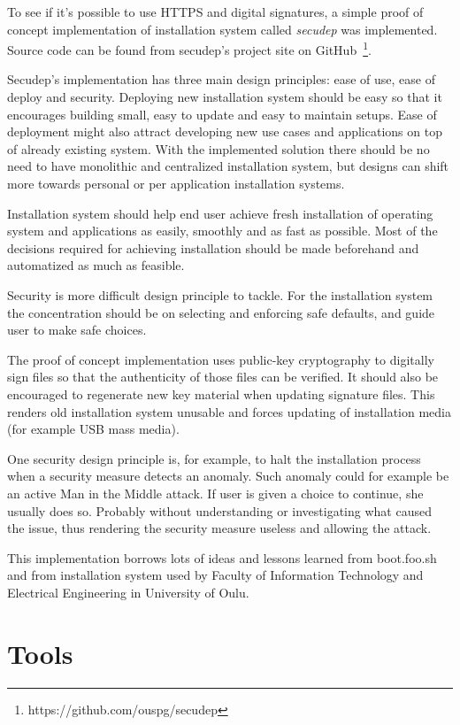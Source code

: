 
To see if it's possible to use HTTPS and digital signatures, a simple
proof of concept implementation of installation system
called \emph{secudep} was implemented. Source code can be found from
secudep's project site on
GitHub~\footnote{https://github.com/ouspg/secudep}.

Secudep's implementation has three main design principles: ease of
use, ease of deploy and security. Deploying new installation system
should be easy so that it encourages building small, easy to update
and easy to maintain setups. Ease of deployment might also attract
developing new use cases and applications on top of already existing
system. With the implemented solution there should be no need to have
monolithic and centralized installation system, but designs can shift
more towards personal or per application installation systems.

Installation system should help end user achieve fresh installation of
operating system and applications as easily, smoothly and as fast as
possible. Most of the decisions required for achieving installation
should be made beforehand and automatized as much as feasible.

Security is more difficult design principle to tackle. For the
installation system the concentration should be on selecting and
enforcing safe defaults, and guide user to make safe choices.

The proof of concept implementation uses public-key cryptography to
digitally sign files so that the authenticity of those files can be
verified. It should also be encouraged to regenerate new key material
when updating signature files. This renders old installation system
unusable and forces updating of installation media (for example USB
mass media).

One security design principle is, for example, to halt the
installation process when a security measure detects an anomaly. Such
anomaly could for example be an active Man in the Middle attack. If
user is given a choice to continue, she usually does so. Probably
without understanding or investigating what caused the issue, thus
rendering the security measure useless and allowing the attack.

This implementation borrows lots of ideas and lessons learned from
boot.foo.sh~\cite{boot-foo-sh} and from installation system
used by Faculty of Information Technology and Electrical Engineering
in University of Oulu.

\section{Tools}

